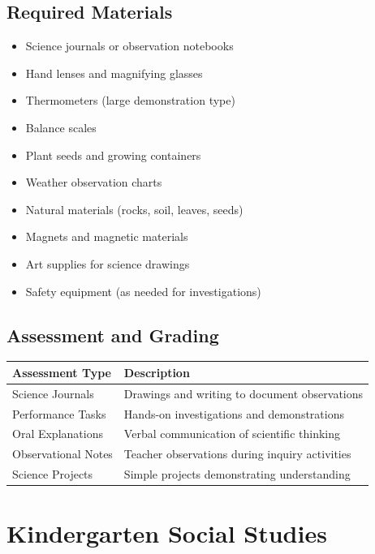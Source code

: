 \documentclass[11pt,letterpaper]{report}
\begin{document}
\section{Required Materials}

\begin{itemize}
    \item Science journals or observation notebooks
    \item Hand lenses and magnifying glasses
    \item Thermometers (large demonstration type)
    \item Balance scales
    \item Plant seeds and growing containers
    \item Weather observation charts
    \item Natural materials (rocks, soil, leaves, seeds)
    \item Magnets and magnetic materials
    \item Art supplies for science drawings
    \item Safety equipment (as needed for investigations)
\end{itemize}

\section{Assessment and Grading}

\begin{center}
\begin{tabular}{|l|p{8cm}|}
\hline
\textbf{Assessment Type} & \textbf{Description} \\
\hline
Science Journals & Drawings and writing to document observations \\
\hline
Performance Tasks & Hands-on investigations and demonstrations \\
\hline
Oral Explanations & Verbal communication of scientific thinking \\
\hline
Observational Notes & Teacher observations during inquiry activities \\
\hline
Science Projects & Simple projects demonstrating understanding \\
\hline
\end{tabular}
\end{center}

\chapter{Kindergarten Social Studies}
\end{document}
